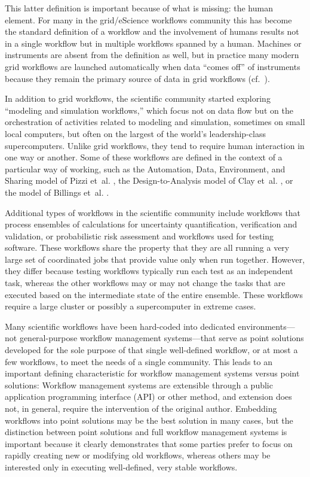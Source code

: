 This latter definition is important because of what is missing: the human
element. For many in the grid/eScience workflows community this has become the
standard definition of a workflow and the involvement of humans results not in a
single workflow but in multiple workflows spanned by a human.  Machines or
instruments are absent from the definition as well, but in practice many modern
grid workflows are launched automatically when data ``comes off'' of instruments
because they remain the primary source of data in grid workflows
(cf.~\cite{megino_panda:_2015}).

In addition to grid workflows, the scientific community started exploring
``modeling and simulation workflows,'' which focus not on data flow but on the
orchestration of activities related to modeling and simulation,
sometimes on small local computers, but often on the largest of the world's
leadership-class supercomputers. Unlike grid workflows, they tend to require
human interaction in one way or another.  Some of these workflows are defined
in the context of a particular way of working, such as the Automation, Data,
Environment, and Sharing model of Pizzi et~al. \cite{pizzi_aiida:_2016}, the
Design-to-Analysis model of Clay et~al. \cite{clay_incorporating_2015}, or the
model of Billings et~al. \cite{billings_eclipse_2017}.

Additional types of workflows in the scientific community include workflows that
process ensembles of calculations for uncertainty quantification, verification
and validation, or probabilistic risk assessment \cite{montoya_apex_2016} and
workflows used for testing software. These workflows share the property
that they are all running a very large set of coordinated jobs that provide
value only when run together. However, they differ because testing workflows
typically run each test as an independent task, whereas the other workflows may
or may not change the tasks that are executed based on the intermediate state of
the entire ensemble. These workflows require a large cluster or possibly a
supercomputer in extreme cases.

Many scientific workflows have been hard-coded into dedicated environments---not
general-purpose workflow management systems---that serve as point solutions
developed for the sole purpose of that single well-defined workflow, or at most
a few workflows, to meet the needs of a single community. This leads to an
important defining characteristic for workflow management systems versus
point solutions: Workflow management systems are extensible through a public
application programming interface (API) or other method, and extension does not,
in general, require the intervention of the original author. Embedding workflows
into point solutions may be the best solution in many cases, but the
distinction between point solutions and full workflow management systems is
important because it clearly demonstrates  that some parties prefer to focus on
rapidly creating new or modifying old workflows, whereas others may be
interested only in executing well-defined, very stable workflows.

